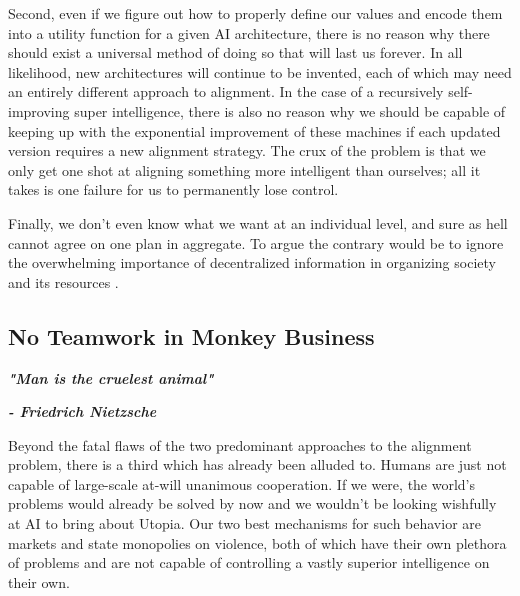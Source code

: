 \documentclass{article}[10pt]
\begin{document}
Second, even if we figure out how to properly define our values and encode them into a utility function for a given AI architecture, there is no reason why there should exist a universal method of doing so that will last us forever. 
In all likelihood, new architectures will continue to be invented, each of which may need an entirely different approach to alignment.
In the case of a recursively self-improving super intelligence, there is also no reason why we should be capable of keeping up with the exponential improvement of these machines if each updated version requires a new alignment strategy.
The crux of the problem is that we only get one shot at aligning something more intelligent than ourselves; all it takes is one failure for us to permanently lose control.\par

Finally, we don't even know what we want at an individual level, and sure as hell cannot agree on one plan in aggregate.
To argue the contrary would be to ignore the overwhelming importance of decentralized information in organizing society and its resources \cite{hayek1945use}.


\subsection{No Teamwork in Monkey Business}
\label{subsection:monkeyBusiness}

\noindent \begin{center}\begin{minipage}[t]{0.9\columnwidth}
    \textbf{\textit{"Man is the cruelest animal"}}\par
    \textbf{\textit{- Friedrich Nietzsche}}
\end{minipage}\end{center} 
\vspace{0.05in}

Beyond the fatal flaws of the two predominant approaches to the alignment problem, there is a third which has already been alluded to.
Humans are just not capable of large-scale at-will unanimous cooperation.
If we were, the world's problems would already be solved by now and we wouldn't be looking wishfully at AI to bring about Utopia.
Our two best mechanisms for such behavior are markets and state monopolies on violence, both of which have their own plethora of problems and are not capable of controlling a vastly superior intelligence on their own.\par
\end{document}
